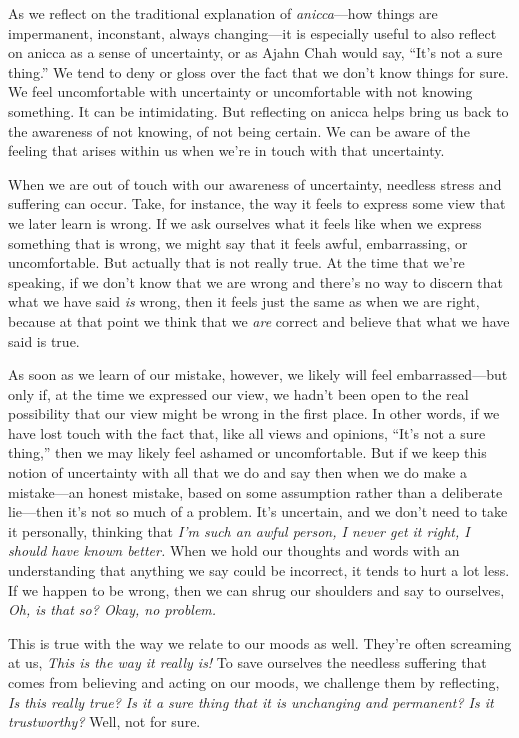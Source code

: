 
As we reflect on the traditional explanation of \emph{anicca}---how 
things are impermanent, inconstant, always changing---it is especially 
useful to also reflect on anicca as a sense of uncertainty, or as Ajahn 
Chah would say, ``It's not a sure thing.'' We tend to deny or gloss 
over the fact that we don't know things for sure. We feel uncomfortable 
with uncertainty or uncomfortable with not knowing something. It can be 
intimidating. But reflecting on anicca helps bring us back to the 
awareness of not knowing, of not being certain. We can be aware of the 
feeling that arises within us when we're in touch with that uncertainty.

When we are out of touch with our awareness of uncertainty, needless 
stress and suffering can occur. Take, for instance, the way it feels to 
express some view that we later learn is wrong. If we ask ourselves 
what it feels like when we express something that is wrong, we might 
say that it feels awful, embarrassing, or uncomfortable. But actually 
that is not really true. At the time that we're speaking, if we don't 
know that we are wrong and there's no way to discern that what we have 
said \emph{is} wrong, then it feels just the same as when we are right, 
because at that point we think that we \emph{are} correct and believe 
that what we have said is true.

As soon as we learn of our mistake, however, we likely will feel 
embarrassed---but only if, at the time we expressed our view, we hadn't 
been open to the real possibility that our view might be wrong in the 
first place. In other words, if we have lost touch with the fact that, 
like all views and opinions, ``It's not a sure thing,'' then we may 
likely feel ashamed or uncomfortable. But if we keep this notion of 
uncertainty with all that we do and say then when we do make a 
mistake---an honest mistake, based on some assumption rather than a 
deliberate lie---then it's not so much of a problem. It's uncertain, 
and we don't need to take it personally, thinking that \emph{I'm such 
an awful person, I never get it right, I should have known better.} 
When we hold our thoughts and words with an understanding that anything 
we say could be incorrect, it tends to hurt a lot less. If we happen to 
be wrong, then we can shrug our shoulders and say to ourselves, 
\emph{Oh, is that so? Okay, no problem.}

This is true with the way we relate to our moods as well. They're often 
screaming at us, \emph{This is the way it really is!} To save ourselves 
the needless suffering that comes from believing and acting on our 
moods, we challenge them by reflecting, \emph{Is this really true? Is 
it a sure thing that it is unchanging and permanent? Is it 
trustworthy?} Well, not for sure.

